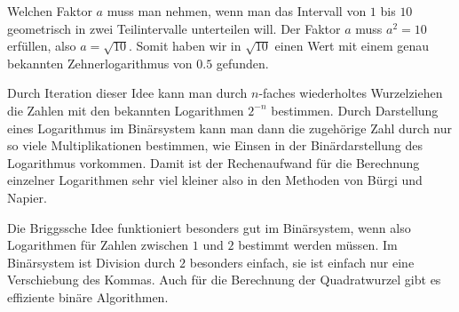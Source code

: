 Welchen Faktor $a$ muss man nehmen, wenn man das Intervall von
$1$ bis $10$ geometrisch in zwei Teilintervalle unterteilen will.
Der Faktor $a$ muss $a^2=10$ erfüllen, also $a=\sqrt{10}$.
Somit haben wir in $\sqrt{10}$ einen Wert mit einem genau
bekannten Zehnerlogarithmus von $0.5$ gefunden.

Durch Iteration dieser Idee kann man durch $n$-faches
wiederholtes Wurzelziehen die Zahlen mit den bekannten
Logarithmen $2^{-n}$ bestimmen.
Durch Darstellung eines Logarithmus im Binärsystem kann
man dann die zugehörige Zahl durch nur so viele Multiplikationen
bestimmen, wie Einsen in der Binärdarstellung des Logarithmus
vorkommen.
Damit ist der Rechenaufwand für die Berechnung einzelner
Logarithmen sehr viel kleiner also in den Methoden von Bürgi
und Napier.

Die Briggssche Idee funktioniert besonders gut im Binärsystem,
wenn also Logarithmen für Zahlen zwischen $1$ und $2$ bestimmt
werden müssen.
Im Binärsystem ist Division durch $2$ besonders einfach, sie ist
einfach nur eine Verschiebung des Kommas.
Auch für die Berechnung der Quadratwurzel gibt es effiziente
binäre Algorithmen.








